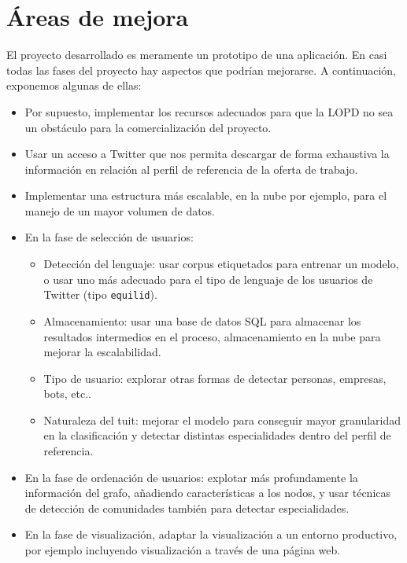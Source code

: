 \chapter{\'Areas de mejora}

El proyecto desarrollado es meramente un prototipo de una aplicación.
En casi todas las fases del proyecto hay aspectos que podrían
mejorarse. A continuación, exponemos algunas de ellas:
\begin{itemize} 
\item Por supuesto, implementar los recursos adecuados para que la 
LOPD no sea un obstáculo para la comercialización del proyecto.
\item Usar un acceso a Twitter que nos permita descargar de forma exhaustiva
la información en relación al perfil de referencia de la oferta de trabajo.
\item Implementar una estructura más escalable, en la nube por ejemplo,
para el manejo de un mayor volumen de datos.
\item En la fase de selección de usuarios:
\begin{itemize}
\item Detección del lenguaje: usar corpus etiquetados para entrenar un modelo,
o usar uno más adecuado para el tipo de lenguaje de los usuarios de Twitter 
(tipo {\tt equilid}).
\item Almacenamiento: usar una base de datos SQL para almacenar los resultados 
intermedios en el proceso, almacenamiento en la nube para mejorar la escalabilidad.
\item Tipo de usuario: explorar otras formas de detectar personas, empresas, bots, etc..
\item Naturaleza del tuit: mejorar el modelo para conseguir mayor granularidad en
la clasificación y detectar distintas especialidades dentro del perfil de referencia.
\end{itemize} 
\item En la fase de ordenación de usuarios: explotar más profundamente la información
del grafo, añadiendo características a los nodos, y usar técnicas de detección de comunidades
también para detectar especialidades.
\item En la fase de visualización, adaptar la visualización a un entorno productivo,
por ejemplo incluyendo visualización a través de una página web.
\end{itemize} 